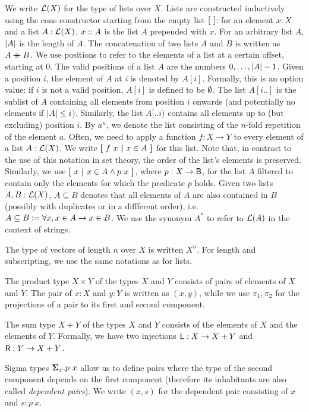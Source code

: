 We write $\mathcal{L} (X)$ for the type of lists over $X$. Lists are constructed inductively using the cons constructor starting from the empty list $[~]$: for an element $x : X$ and a list $A : \mathcal{L} (X)$, $x::{} A$ is the list $A$ prepended with $x$.
For an arbitrary list $A$, $|A|$ is the length of $A$. 
The concatenation of two lists $A$ and $B$ is written as $A \mathbin{+\mkern-10mu+}{} B$. 
We use positions to refer to the elements of a list at a certain offset, starting at 0. The valid positions of a list $A$ are the numbers $0, \ldots, |A|-1$. 
Given a position $i$, the element of $A$ at $i$ is denoted by $A[i]$. Formally, this is an option value: if $i$ is not a valid position, $A[i]$ is defined to be $\emptyset{}$. 
The list $A[i..]$ is the sublist of $A$ containing all elements from position $i$ onwards (and potentially no elements if $|A| \le i$). Similarly, the list $A[..i)$ contains all elements up to (but excluding) position $i$. 
By $a^n$, we denote the list consisting of the $n$-fold repetition of the element $a$.
Often, we need to apply a function $f : X \rightarrow Y$ to every element of a list $A : \mathcal{L} (X)$. We write $\textbf{[}~ f~x ~\textbf{|}~ x \in A ~\textbf{]}$ for this list. Note that, in contrast to the use of this notation in set theory, the order of the list's elements is preserved. 
Similarly, we use $\textbf{[}~ x ~\textbf{|}~ x \in A \land p~x ~\textbf{]}$, where $p : X \rightarrow \textsf{B}$, for the list $A$ filtered to contain only the elements for which the predicate $p$ holds.
Given two lists $A, B : \mathcal{L} (X)$, $A \subseteq B$ denotes that all elements of $A$ are also contained in $B$ (possibly with duplicates or in a diffferent order), i.e.\ $A \subseteq B \coloneqq \forall x, x \in A \rightarrow x \in B$. 
We use the synonym $A^*$ to refer to $\mathcal{L} (A)$ in the context of strings.

The type of vectors of length $n$ over $X$ is written $X^n$. For length and subscripting, we use the same notations as for lists.

The product type $X \times Y$ of the types $X$ and $Y$ consists of pairs of elements of $X$ and $Y$. The pair of $x : X$ and $y : Y$ is written as $(x, y)$, while we use $\pi_1, \pi_2$ for the projections of a pair to its first and second component. 

The sum type $X + Y$ of the types $X$ and $Y$ consists of the elements of $X$ and the elements of $Y$. Formally, we have two injections $\textsf{L} : X \rightarrow X + Y$ and $\textsf{R} : Y \rightarrow X + Y$. 

Sigma types $\bm{\Sigma}_{x}.p~x$ allow us to define pairs where the type of the second component depends on the first component (therefore its inhabitants are also called \textit{dependent pairs}). We write $(x, s)$ for the dependent pair consisting of $x$ and $s : p~x$. 


